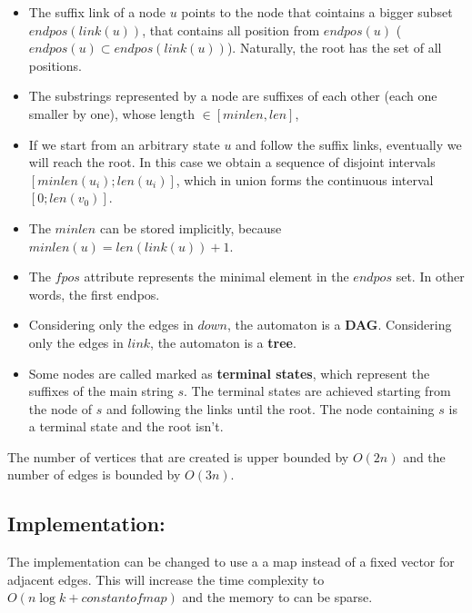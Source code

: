 \begin{itemize}
        \item The suffix link of a node $u$ points to the node that cointains a bigger subset $endpos(link(u))$,
        that contains all position from $endpos(u)$ ($endpos(u) \subset endpos(link(u))$). Naturally, the root has the set of all positions.

        \item The substrings represented by a node are suffixes of each other (each one smaller by one), whose length $\in [minlen, len]$,

        \item If we start from an arbitrary state $u$ and follow the suffix links, eventually we will reach the root.
        In this case we obtain a sequence of disjoint intervals $[minlen(u_i); len(u_i)]$, 
        which in union forms the continuous interval $[0; len(v_0)]$.

        \item The $minlen$ can be stored implicitly, because $minlen(u) = len(link(u)) + 1$.

        \item The $fpos$ attribute represents the minimal element in the $endpos$ set. In other words, the first endpos.

        \item Considering only the edges in $down$, the automaton is a \textbf{DAG}. Considering only the edges in $link$, the automaton is a \textbf{tree}.

        \item Some nodes are called marked as \textbf{terminal states}, which represent the suffixes of the main string $s$. 
        The terminal states are achieved starting from the node of $s$ and following the links until the root. 
        The node containing $s$ is a terminal state and the root isn't.

    \end{itemize}

    The number of vertices that are created is upper bounded by \textbf{$O(2n)$} and the number of edges is bounded by \textbf{$O(3n)$}.

    \subsection{Implementation:}

    The implementation can be changed to use a a map instead of a fixed vector for adjacent edges.
    This will increase the time complexity to $O(n \log{k} + constant of map)$ and the memory to can be sparse.

